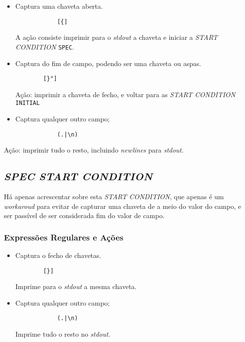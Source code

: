 \begin{itemize}
  \item Captura uma chaveta aberta.
    \begin{verbatim}
			[{]
    \end{verbatim}
		A ação consiste imprimir para o \emph{stdout} a chaveta e iniciar
		a \emph{START CONDITION} \texttt{SPEC}.

  \item Captura do fim de campo, podendo ser uma chaveta ou aspas.
    \begin{verbatim}
		[}"]
    \end{verbatim}
		Ação: imprimir a chaveta de fecho, e voltar para as \emph{START CONDITION}
		\texttt{INITIAL}

  \item Captura qualquer outro campo;
    \begin{verbatim}
			(.|\n)
    \end{verbatim}
\end{itemize}
Ação: imprimir tudo o resto, incluindo \emph{newlines} para \emph{stdout}.



\subsection{\emph{SPEC \emph{START CONDITION}}}

Há apenas acrescentar sobre esta \emph{START CONDITION}, que apenas é um
\emph{workaroud} para evitar de capturar uma chaveta de a meio do valor do
campo, e ser passível de ser considerada fim do valor de campo. 

\subsubsection{Expressões Regulares e Ações}
\begin{itemize}
  \item Captura o fecho de chavetas.
    \begin{verbatim}
		[}]
    \end{verbatim}
		Imprime para o \emph{stdout} a mesma chaveta.


  \item Captura qualquer outro campo;
    \begin{verbatim}
			(.|\n)
    \end{verbatim}
		Imprime tudo o resto no \emph{stdout}.
	
\end{itemize}
